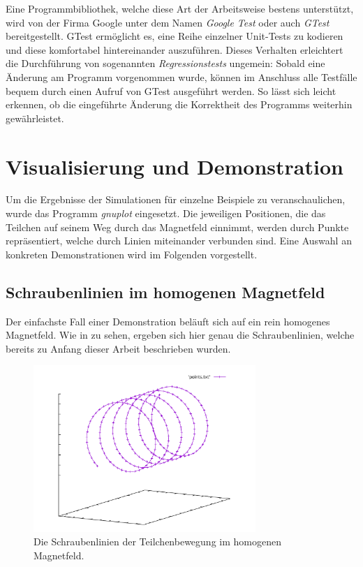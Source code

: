 Eine Programmbibliothek, welche diese Art der Arbeitsweise bestens unterst\"utzt, wird von der Firma Google unter dem Namen
\textit{Google Test}
oder auch \textit{GTest} bereitgestellt. GTest erm\"oglicht es, eine Reihe einzelner Unit-Tests zu kodieren und diese komfortabel
hintereinander auszuf\"uhren. Dieses Verhalten erleichtert die Durchf\"uhrung von sogenannten \textit{Regressionstests} ungemein:
Sobald eine \"Anderung am Programm vorgenommen wurde, k\"onnen im Anschluss alle Testf\"alle bequem durch einen Aufruf von GTest
ausgef\"uhrt werden. So l\"asst sich leicht erkennen, ob die eingef\"uhrte  \"Anderung die Korrektheit des Programms weiterhin
gew\"ahrleistet.

\section{Visualisierung und Demonstration}

Um die Ergebnisse der Simulationen f\"ur einzelne Beispiele zu veranschaulichen, wurde das Programm \textit{gnuplot} eingesetzt.
Die jeweiligen Positionen, die das Teilchen auf seinem Weg durch das Magnetfeld einnimmt, werden durch Punkte repr\"asentiert,
welche durch Linien miteinander verbunden sind. Eine Auswahl an konkreten Demonstrationen wird im Folgenden vorgestellt.

\subsection{Schraubenlinien im homogenen Magnetfeld}

Der einfachste Fall einer Demonstration bel\"auft sich auf ein rein homogenes Magnetfeld. Wie in  zu sehen,
ergeben sich hier genau die Schraubenlinien, welche bereits zu Anfang dieser Arbeit beschrieben wurden.

\begin{figure}[h]
  \label{fig:homogeneous_plot}
  \centering
  \includegraphics[width=0.75\textwidth]{gnuplot/homogeneous}
  \caption{Die Schraubenlinien der Teilchenbewegung im homogenen Magnetfeld.}
\end{figure}


